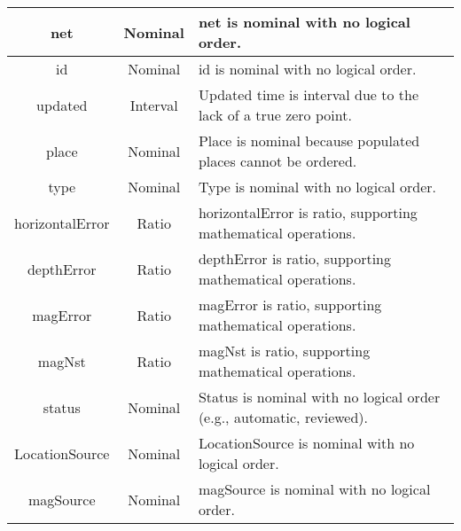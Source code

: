 \documentclass{article}
\begin{document}
\begin{tabular}{|c|c|p{11cm}|}
    \hline
    net                & Nominal        & net is nominal with no logical order.                                                 \\
    \hline
    id                 & Nominal        & id is nominal with no logical order.                                                  \\
    \hline
    updated            & Interval       & Updated time is interval due to the lack of a true zero point.                        \\
    \hline
    place              & Nominal        & Place is nominal because populated places cannot be ordered.                          \\
    \hline
    type               & Nominal        & Type is nominal with no logical order.                                                \\
    \hline
    horizontalError    & Ratio          & horizontalError is ratio, supporting mathematical operations.                         \\
    \hline
    depthError         & Ratio          & depthError is ratio, supporting mathematical operations.                              \\
    \hline
    magError           & Ratio          & magError is ratio, supporting mathematical operations.                                \\
    \hline
    magNst             & Ratio          & magNst is ratio, supporting mathematical operations.                                  \\
    \hline
    status             & Nominal        & Status is nominal with no logical order (e.g., automatic, reviewed).                  \\
    \hline
    LocationSource     & Nominal        & LocationSource is nominal with no logical order.                                      \\
    \hline
    magSource          & Nominal        & magSource is nominal with no logical order.                                           \\
    \hline
\end{tabular}
\end{document}
